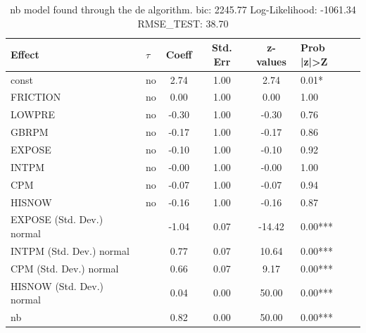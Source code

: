 \begin{table}
	\caption{nb model found through the de algorithm. bic: 2245.77 Log-Likelihood: -1061.34 RMSE_TEST: 38.70}
	\begin{center}
		\begin{tabular}{|l|l|c|c|c|l|}
			\hline
			Effect & $\tau$ & Coeff & Std. Err & z-values & Prob |z|>Z \\
			\hline
			const & no & 2.74 & 1.00 & 2.74 & 0.01* \\
			\hline
			FRICTION & no & 0.00 & 1.00 & 0.00 & 1.00 \\
			\hline
			LOWPRE & no & -0.30 & 1.00 & -0.30 & 0.76 \\
			\hline
			GBRPM & no & -0.17 & 1.00 & -0.17 & 0.86 \\
			\hline
			EXPOSE & no & -0.10 & 1.00 & -0.10 & 0.92 \\
			\hline
			INTPM & no & -0.00 & 1.00 & -0.00 & 1.00 \\
			\hline
			CPM & no & -0.07 & 1.00 & -0.07 & 0.94 \\
			\hline
			HISNOW & no & -0.16 & 1.00 & -0.16 & 0.87 \\
			\hline
			EXPOSE (Std. Dev.) normal &  & -1.04 & 0.07 & -14.42 & 0.00*** \\
			\hline
			INTPM (Std. Dev.) normal &  & 0.77 & 0.07 & 10.64 & 0.00*** \\
			\hline
			CPM (Std. Dev.) normal &  & 0.66 & 0.07 & 9.17 & 0.00*** \\
			\hline
			HISNOW (Std. Dev.) normal &  & 0.04 & 0.00 & 50.00 & 0.00*** \\
			\hline
			nb &  & 0.82 & 0.00 & 50.00 & 0.00*** \\
			\hline
		\end{tabular}
	\end{center}
\end{table}